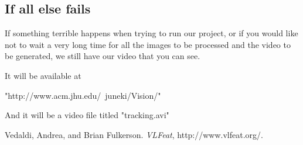 \documentclass[a4paper, 10pt, conference]{ieeeconf}      %
\begin{document}
\subsection{If all else fails}
If something terrible happens when trying to run our project, or if you would like not to wait a very long time for all the images to be processed and the video to be generated, we still have our video that you can see. \newline

It will be available at 

"http://www.acm.jhu.edu/~juneki/Vision/"

And it will be a video file titled "tracking.avi"








\begin{thebibliography}{99}

Vedaldi, Andrea, and Brian Fulkerson. {\it VLFeat}, http://www.vlfeat.org/.



\end{thebibliography}
\end{document}
